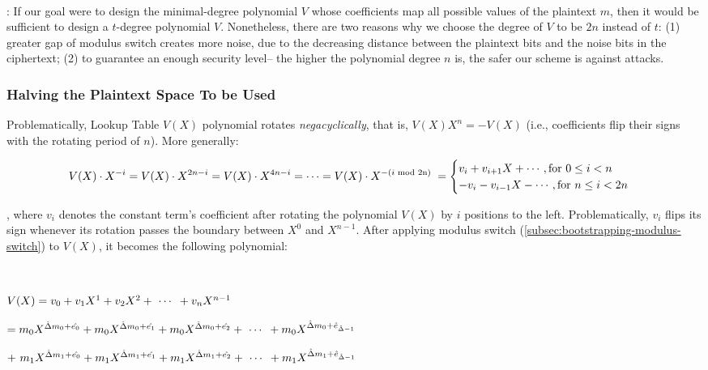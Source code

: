 $ $

: If our goal were to design the minimal-degree polynomial $V$ whose coefficients map all possible values of the plaintext $m$, then it would be sufficient to design a ${t}$-degree polynomial $V$. Nonetheless, there are two reasons why we choose the degree of $V$ to be $2n$ instead of ${t}$: (1) greater gap of modulus switch creates more noise, due to the decreasing distance between the plaintext bits and the noise bits in the ciphertext; (2) to guarantee an enough security level-- the higher the polynomial degree $n$ is, the safer our scheme is against attacks. 



\subsubsection{Halving the Plaintext Space To be Used}
\label{subsec:tfhe-zero-padding} 

Problematically, Lookup Table $V(X)$ polynomial rotates \textit{negacyclically}, that is, $V(X)X^{n} = -V(X)$ (i.e., coefficients flip their signs with the rotating period of $n$). More generally:

\begin{figure}[h]
\[
    V(X)\cdot X^{-i}= V(X)\cdot X^{2n - i} = V(X)\cdot X^{4n - i} = \cdots = V(X)\cdot X^{-(i \text{ } \text{\text{mod} 2n)} \text{ }} =  
\begin{cases}
    v_i  + v_{i+1}X + \cdots, \text{for } 0\leq i<n\\
    -v_{i} - v_{i-1}X - \cdots, \text{for } n\leq i<2n
\end{cases}
\]
\end{figure}

\noindent , where $v_i$ denotes the constant term's coefficient after rotating the polynomial $V(X)$ by $i$ positions to the left. Problematically, $v_i$ flips its sign whenever its rotation passes the boundary between $X^0$ and $X^{n-1}$. After applying modulus switch (\autoref{subsec:bootstrapping-modulus-switch}) to $V(X)$, it becomes the following polynomial:

$ $

$V(X) = v_0 + v_1X^1 + v_2X^2 + \text{ } \text{$\cdots$} \text{ } + v_nX^{n-1}$

\text{ } $= m_0X^{\hat{\Delta} m_0 + \hat{e_0}} + m_0X^{\hat{\Delta} m_0 + \hat{e_1}} + m_0X^{\hat{\Delta} m_0 + \hat{e_2}} + \text{ } \text{$\cdots$} \text{ } +  m_0X^{\hat{\Delta} m_0 + \hat{e}_{\hat{\Delta} - 1}}$

\text{ } $ + \text{ } m_1X^{\hat{\Delta} m_1 + \hat{e_0}} + m_1X^{\hat{\Delta} m_1 + \hat{e_1}} + m_1X^{\hat{\Delta} m_1 + \hat{e_2}} + \text{ } \text{$\cdots$} \text{ } + m_1X^{\hat{\Delta} m_1 + \hat{e}_{\hat{\Delta} - 1}}$


